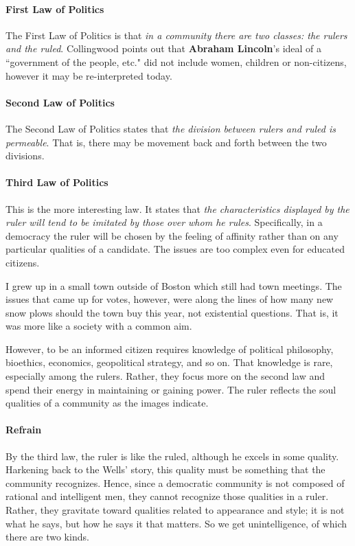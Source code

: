 \paragraph{First Law of Politics}
The First Law of Politics is that \emph{in a community there are two classes: the rulers and the ruled}. Collingwood points out that \textbf{Abraham Lincoln}'s ideal of a ``government of the people, etc." did not include women, children or non-citizens, however it may be re-interpreted today.

\paragraph{Second Law of Politics}
The Second Law of Politics states that \emph{the division between rulers and ruled is permeable}. That is, there may be movement back and forth between the two divisions.

\paragraph{Third Law of Politics}
This is the more interesting law. It states that \emph{the characteristics displayed by the ruler will tend to be imitated by those over whom he rules}. Specifically, in a democracy the ruler will be chosen by the feeling of affinity rather than on any particular qualities of a candidate. The issues are too complex even for educated citizens. 

I grew up in a small town outside of Boston which still had town meetings. The issues that came up for votes, however, were along the lines of how many new snow plows should the town buy this year, not existential questions. That is, it was more like a society with a common aim.

However, to be an informed citizen requires knowledge of political philosophy, bioethics, economics, geopolitical strategy, and so on. That knowledge is rare, especially among the rulers. Rather, they focus more on the second law and spend their energy in maintaining or gaining power. The ruler reflects the soul qualities of a community as the images indicate.

\paragraph{Refrain}
By the third law, the ruler is like the ruled, although he excels in some quality. Harkening back to the Wells' story, this quality must be something that the community recognizes. Hence, since a democratic community is not composed of rational and intelligent men, they cannot recognize those qualities in a ruler. Rather, they gravitate toward qualities related to appearance and style; it is not what he says, but how he says it that matters. So we get unintelligence, of which there are two kinds.

